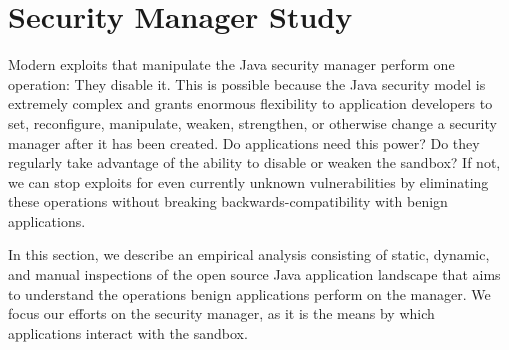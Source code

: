\documentclass{sig-alternate}
\begin{document}


\section{Security Manager Study}\label{sec:Security-Manager-Study}

Modern exploits that manipulate the Java security manager perform one
operation: They disable it.  This is possible because the Java security model is extremely
complex and grants enormous flexibility to application developers to
set, reconfigure, manipulate, weaken, strengthen, or otherwise change a security
manager after it has been created.
Do applications need this power?  Do they regularly take advantage of the
ability to disable or weaken the sandbox?  If not, we can stop exploits for even currently unknown vulnerabilities by eliminating these operations without breaking backwards-compatibility with benign applications.

In this section, we describe an empirical analysis consisting of static,
dynamic, and manual inspections of the open source Java application landscape
that aims to understand the operations benign applications perform on the
manager. We focus our efforts on the security manager, as it is the
means by which applications interact with the sandbox.
\end{document}
